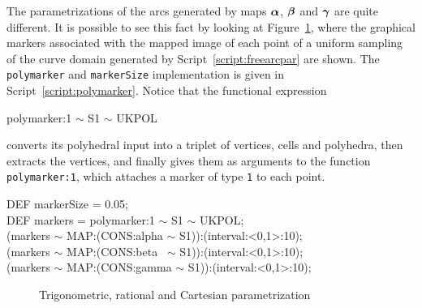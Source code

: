 \documentclass{31x47jw}
\begin{document}
\begin{example}
\label{ex:5:compare}

The parametrizations of the arcs generated by maps ${\mbox{\boldmath $\alpha$}}$,
${\mbox{\boldmath $\beta$}}$ and ${\mbox{\boldmath $\gamma$}}$ are quite different.  It is possible to
see this fact by looking at Figure~\ref{fig:arcs}, where the graphical
markers associated with the mapped image of each point of a uniform
sampling of the curve domain generated by
Script~\ref{script:freearcpar} are shown.  The \texttt{polymarker} and
\texttt{markerSize} implementation is given in
Script~\ref{script:polymarker}.  Notice that the functional expression
\begin{smallplasm}
    polymarker:1 $\sim$ S1 $\sim$ UKPOL
\end{smallplasm}
converts its polyhedral input into a triplet of vertices, cells and
polyhedra, then extracts the vertices, and finally gives them as
arguments to the function \texttt{polymarker:1}, which attaches a
marker of type \texttt{1} to each point.

\begin{script} 
\begin{smallplasm}
DEF markerSize  = 0.05;\\    
DEF markers = polymarker:1 $\sim$ S1 $\sim$ UKPOL; \\[0.3cm]
(markers $\sim$ MAP:(CONS:alpha $\sim$ S1)):(interval:<0,1>:10);\\
(markers $\sim$ MAP:(CONS:beta~ $\sim$ S1)):(interval:<0,1>:10);\\
(markers $\sim$ MAP:(CONS:gamma $\sim$ S1)):(interval:<0,1>:10);
\end{smallplasm}
\label{script:freearcpar}
\end{script}

\begin{figure}[htb]
    \centering
    \begin{minipage}[b]{0.32\linewidth}
            \centering{}
    \end{minipage}
    \hfill
    \begin{minipage}[b]{0.32\linewidth}
            \centering{}
    \end{minipage}
    \hfill
    \begin{minipage}[b]{0.32\linewidth}
            \centering{}
    \end{minipage}
\caption{Trigonometric, rational and Cartesian parametrization 
\label{fig:arcs}}
\end{figure}

\end{example}
\end{document}
